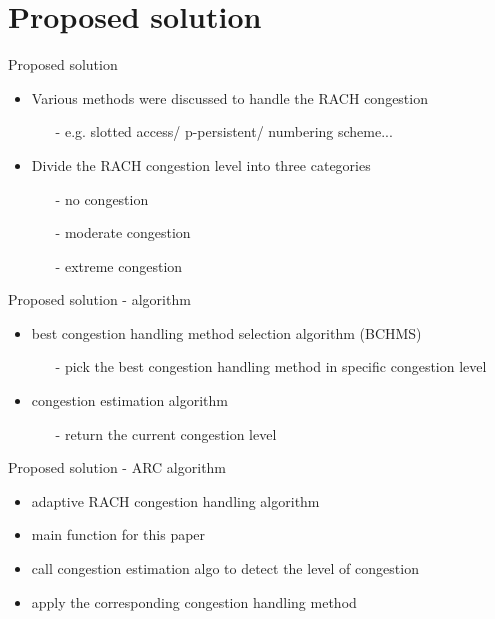 \documentclass{beamer}
\begin{document}
\section{Proposed solution}
\begin{frame}{{Proposed solution}}
    \begin{itemize}
        \item{Various methods were discussed to handle the RACH congestion }
        \begin{itemize}    
            \item[-]{e.g. slotted access/ p-persistent/ numbering scheme...}
        \end{itemize}
        \item{Divide the RACH congestion level into three categories}
        \begin{itemize}    
            \item[-]{no congestion}
            \item[-]{moderate congestion}
            \item[-]{extreme congestion}
        \end{itemize}
    \end{itemize}
\end{frame}
\begin{frame}{{Proposed solution - algorithm}}
    \begin{itemize}
        \item{best congestion handling method selection algorithm (BCHMS)}
        \begin{itemize} 
            \item[-]{pick the best congestion handling method in specific congestion level}
        \end{itemize}
        \item{congestion estimation algorithm}
        \begin{itemize} 
            \item[-]{return the current congestion level}
        \end{itemize}
    \end{itemize}
\end{frame}
\begin{frame}{{Proposed solution - ARC algorithm}}
    \begin{itemize}
        \item{adaptive RACH congestion handling algorithm}
        \item{main function for this paper}
        \item{call congestion estimation algo to detect the level of congestion}
        \item{apply the corresponding congestion handling method}
    \end{itemize}
\end{frame}
\end{document}
